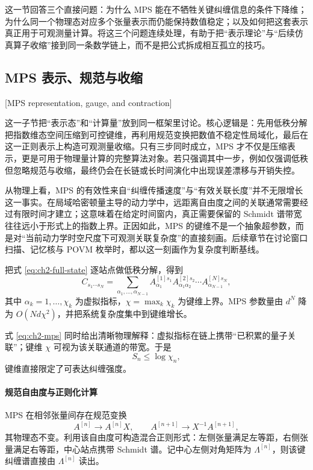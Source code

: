 这一节回答三个直接问题：为什么 MPS 能在不牺牲关键纠缠信息的条件下降维；为什么同一个物理态对应多个张量表示而仍能保持数值稳定；以及如何把这套表示真正用于可观测量计算。将这三个问题连续处理，有助于把“表示理论”与“后续仿真算子收缩”接到同一条数学链上，而不是把公式拆成相互孤立的技巧。

\subsection{MPS 表示、规范与收缩}[MPS representation, gauge, and contraction]

这一子节把“表示态”和“计算量”放到同一框架里讨论。核心逻辑是：先用低秩分解把指数维态空间压缩到可控键维，再利用规范变换把数值不稳定性局域化，最后在这一正则表示上构造可观测量收缩。只有三步同时成立，MPS 才不仅是压缩表示，更是可用于物理量计算的完整算法对象。若只强调其中一步，例如仅强调低秩但忽略规范与收缩，最终仍会在长链或长时间演化中出现误差漂移与开销失控。

从物理上看，MPS 的有效性来自“纠缠传播速度”与“有效关联长度”并不无限增长这一事实。在局域哈密顿量主导的动力学中，远距离自由度之间的关联通常需要经过有限时间才建立；这意味着在给定时间窗内，真正需要保留的 Schmidt 谱带宽往往远小于形式上的指数上界。正因如此，MPS 的键维不是一个抽象超参数，而是对“当前动力学时空尺度下可观测关联复杂度”的直接刻画。后续章节在讨论窗口扫描、记忆核与 POVM 枚举时，都以这一刻画作为复杂度判断基线。

把式 \eqref{eq:ch2-full-state} 逐站点做低秩分解，得到
\begin{equation}
C_{s_1\cdots s_N}
=
\sum_{\alpha_1,\ldots,\alpha_{N-1}}
A^{[1]s_1}_{\alpha_1}
A^{[2]s_2}_{\alpha_1\alpha_2}
\cdots
A^{[N]s_N}_{\alpha_{N-1}},
\label{eq:ch2-mps}
\end{equation}
其中 $\alpha_k=1,\ldots,\chi_k$ 为虚拟指标，$\chi=\max_k\chi_k$ 为键维上界。MPS 参数量由 $d^N$ 降为 $O(Nd\chi^2)$，并把系统复杂度集中到键维增长。

式 \eqref{eq:ch2-mps} 同时给出清晰物理解释：虚拟指标在链上携带“已积累的量子关联”；键维 $\chi$ 可视为该关联通道的带宽。于是
\begin{equation}
S_n\le \log \chi_n,
\end{equation}
键维直接限定了可表达纠缠强度。

\paragraph{规范自由度与正则化计算}

MPS 在相邻张量间存在规范变换
\begin{equation}
A^{[n]}\rightarrow A^{[n]}X,\qquad
A^{[n+1]}\rightarrow X^{-1}A^{[n+1]},
\end{equation}
其物理态不变。利用该自由度可构造混合正则形式：左侧张量满足左等距，右侧张量满足右等距，中心站点携带 Schmidt 谱。记中心左侧对角矩阵为 $\Lambda^{[n]}$，则该键纠缠谱直接由 $\Lambda^{[n]}$ 读出。

